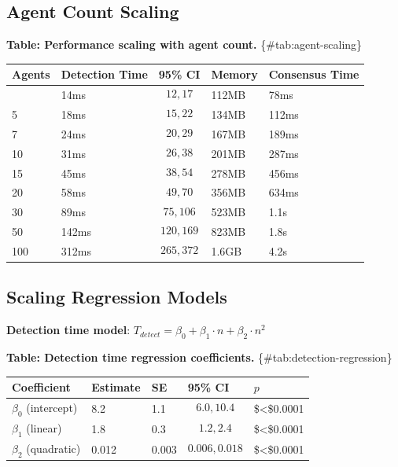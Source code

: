 \documentclass[
]{article}
\newcounter{none} %
\begin{document}
\subsection{Agent Count Scaling}\label{sec:agent-scaling}

\textbf{Table: Performance scaling with agent count.}
\{\#tab:agent-scaling\}

{\def\LTcaptype{none} %
\begin{longtable}[]{@{}lllll@{}}
\toprule\noalign{}
Agents & Detection Time & 95\% CI & Memory & Consensus Time \\
\midrule\noalign{}
\endhead
\bottomrule\noalign{}
\endlastfoot
3 & 14ms & \[12, 17\] & 112MB & 78ms \\
5 & 18ms & \[15, 22\] & 134MB & 112ms \\
7 & 24ms & \[20, 29\] & 167MB & 189ms \\
10 & 31ms & \[26, 38\] & 201MB & 287ms \\
15 & 45ms & \[38, 54\] & 278MB & 456ms \\
20 & 58ms & \[49, 70\] & 356MB & 634ms \\
30 & 89ms & \[75, 106\] & 523MB & 1.1s \\
50 & 142ms & \[120, 169\] & 823MB & 1.8s \\
100 & 312ms & \[265, 372\] & 1.6GB & 4.2s \\
\end{longtable}
}

\subsection{Scaling Regression Models}\label{sec:regression}

\textbf{Detection time model}:
\(T_{detect} = \beta_0 + \beta_1 \cdot n + \beta_2 \cdot n^2\)

\textbf{Table: Detection time regression coefficients.}
\{\#tab:detection-regression\}

{\def\LTcaptype{none} %
\begin{longtable}[]{@{}lllll@{}}
\toprule\noalign{}
Coefficient & Estimate & SE & 95\% CI & \(p\) \\
\midrule\noalign{}
\endhead
\bottomrule\noalign{}
\endlastfoot
\(\beta_0\) (intercept) & 8.2 & 1.1 & \[6.0, 10.4\] &
\$\textless\$0.0001 \\
\(\beta_1\) (linear) & 1.8 & 0.3 & \[1.2, 2.4\] &
\$\textless\$0.0001 \\
\(\beta_2\) (quadratic) & 0.012 & 0.003 & \[0.006, 0.018\] &
\$\textless\$0.0001 \\
\end{longtable}
}
\end{document}
